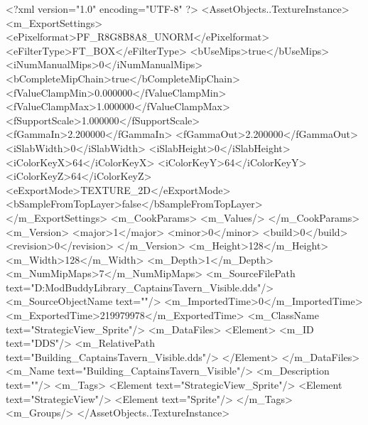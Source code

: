 <?xml version="1.0" encoding="UTF-8" ?>
<AssetObjects..TextureInstance>
	<m_ExportSettings>
		<ePixelformat>PF_R8G8B8A8_UNORM</ePixelformat>
		<eFilterType>FT_BOX</eFilterType>
		<bUseMips>true</bUseMips>
		<iNumManualMips>0</iNumManualMips>
		<bCompleteMipChain>true</bCompleteMipChain>
		<fValueClampMin>0.000000</fValueClampMin>
		<fValueClampMax>1.000000</fValueClampMax>
		<fSupportScale>1.000000</fSupportScale>
		<fGammaIn>2.200000</fGammaIn>
		<fGammaOut>2.200000</fGammaOut>
		<iSlabWidth>0</iSlabWidth>
		<iSlabHeight>0</iSlabHeight>
		<iColorKeyX>64</iColorKeyX>
		<iColorKeyY>64</iColorKeyY>
		<iColorKeyZ>64</iColorKeyZ>
		<eExportMode>TEXTURE_2D</eExportMode>
		<bSampleFromTopLayer>false</bSampleFromTopLayer>
	</m_ExportSettings>
	<m_CookParams>
		<m_Values/>
	</m_CookParams>
	<m_Version>
		<major>1</major>
		<minor>0</minor>
		<build>0</build>
		<revision>0</revision>
	</m_Version>
	<m_Height>128</m_Height>
	<m_Width>128</m_Width>
	<m_Depth>1</m_Depth>
	<m_NumMipMaps>7</m_NumMipMaps>
	<m_SourceFilePath text="D:\MyDocuments\Firaxis ModBuddy\ArtDef Library\RAFOU\StrategicViews\Building_CaptainsTavern_Visible.dds"/>
	<m_SourceObjectName text=""/>
	<m_ImportedTime>0</m_ImportedTime>
	<m_ExportedTime>219979978</m_ExportedTime>
	<m_ClassName text="StrategicView_Sprite"/>
	<m_DataFiles>
		<Element>
			<m_ID text="DDS"/>
			<m_RelativePath text="Building_CaptainsTavern_Visible.dds"/>
		</Element>
	</m_DataFiles>
	<m_Name text="Building_CaptainsTavern_Visible"/>
	<m_Description text=""/>
	<m_Tags>
		<Element text="StrategicView_Sprite"/>
		<Element text="StrategicView"/>
		<Element text="Sprite"/>
	</m_Tags>
	<m_Groups/>
</AssetObjects..TextureInstance>

